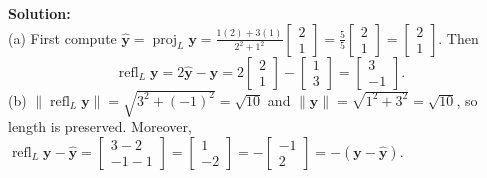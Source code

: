 \documentclass[11pt, letterpaper]{article}
\theoremstyle{definition}
\theoremstyle{remark}
\begin{document}
\textbf{Solution:} \\
(a) First compute $\hat{\mathbf{y}} = \operatorname{proj}_L \mathbf{y} = \frac{1(2) + 3(1)}{2^2 + 1^2}\begin{bmatrix} 2 \\ 1 \end{bmatrix} = \frac{5}{5}\begin{bmatrix} 2 \\ 1 \end{bmatrix} = \begin{bmatrix} 2 \\ 1 \end{bmatrix}$. Then
\[
\operatorname{refl}_L \mathbf{y} = 2\hat{\mathbf{y}} - \mathbf{y} = 2\begin{bmatrix} 2 \\ 1 \end{bmatrix} - \begin{bmatrix} 1 \\ 3 \end{bmatrix} = \begin{bmatrix} 3 \\ -1 \end{bmatrix}.
\]
(b) $\|\operatorname{refl}_L \mathbf{y}\| = \sqrt{3^2 + (-1)^2} = \sqrt{10}$ and $\|\mathbf{y}\| = \sqrt{1^2 + 3^2} = \sqrt{10}$, so length is preserved. Moreover, $\operatorname{refl}_L \mathbf{y} - \hat{\mathbf{y}} = \begin{bmatrix} 3 - 2 \\ -1 - 1 \end{bmatrix} = \begin{bmatrix} 1 \\ -2 \end{bmatrix} = -\begin{bmatrix} -1 \\ 2 \end{bmatrix} = -(\mathbf{y} - \hat{\mathbf{y}})$.
\end{document}
